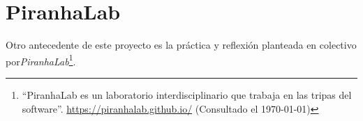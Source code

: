 





\section{PiranhaLab}

Otro antecedente de este proyecto es la práctica y reflexión planteada en colectivo por\textit{PiranhaLab}\footnote{``PiranhaLab es un laboratorio interdisciplinario que trabaja en las tripas del software''. \url{https://piranhalab.github.io/} (Consultado el \today)}.


